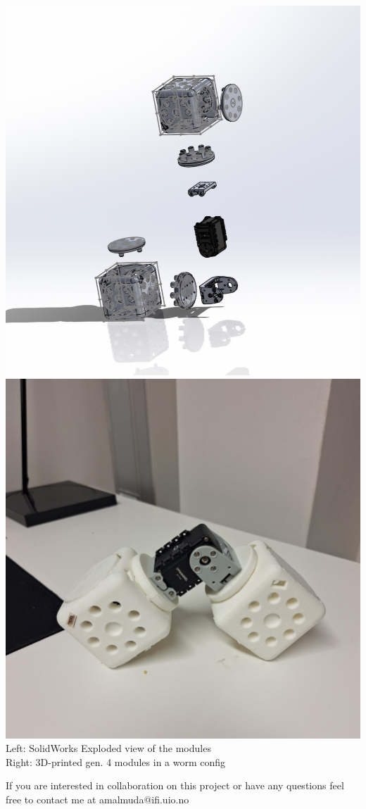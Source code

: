 \documentclass[12pt,a3paper]{article}
\begin{document}
{\begin{center}
       \includegraphics[width=0.47\linewidth]{images/image5a.jpg}
       \hspace{0.03\linewidth} %
       \includegraphics[width=0.47\linewidth]{images/image5b.jpg}
       \\
       \small Left: SolidWorks Exploded view of the modules \\Right: 3D-printed gen. 4 modules in a  worm config
   \end{center}

   If you are interested in collaboration on this project or have any questions feel free to contact me at amalmuda@ifi.uio.no

}

\end{document}
